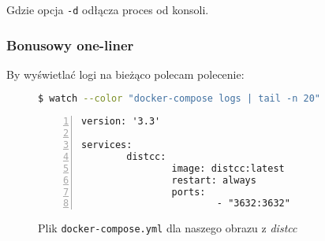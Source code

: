 \documentclass[a4paper,12pt]{article}
\begin{document}
Gdzie opcja \texttt{-d} odłącza proces od konsoli.

\subsubsection*{Bonusowy one-liner}
By wyświetlać logi na bieżąco polecam polecenie:
\begin{figure}[H]
    \begin{lstlisting}[frame=single,basicstyle=\footnotesize\ttfamily,language=bash,morekeywords={tail,docker-compose,watch}]
$ watch --color "docker-compose logs | tail -n 20"
    \end{lstlisting}
\end{figure}


\begin{figure}[p]
    \begin{lstlisting}[frame=L,basicstyle=\footnotesize\ttfamily,numbers=left,
        morekeywords={version,services,image,ports,restart}]
version: '3.3'

services:
        distcc:
                image: distcc:latest
                restart: always
                ports:
                        - "3632:3632"
    \end{lstlisting}
    \caption{Plik \texttt{docker-compose.yml} dla naszego obrazu z \emph{distcc}}
    \label{dockercompose}
\end{figure}



\end{document}
